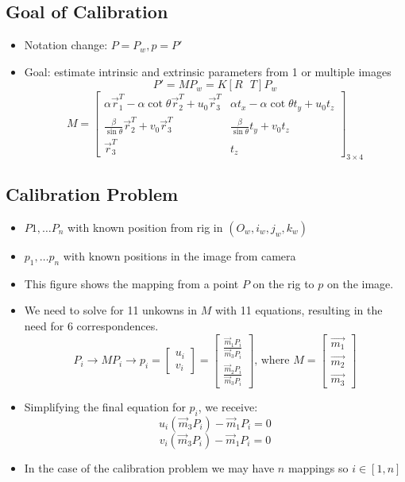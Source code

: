 \subsection{Goal of Calibration}
\begin{itemize}
	\item Notation change: $P=P_w, p=P'$
	\item Goal: estimate intrinsic and extrinsic parameters from 1 or multiple images
	$$P'=MP_w = K[R\text{ }T]P_w$$
	$$M=\begin{bmatrix}
		\alpha\vec{r}_1^T -\alpha\cot\theta\vec{r}_2^T+u_0\vec{r}_3^T &\alpha t_x-\alpha\cot\theta t_y + u_0 t_z \\
		\frac{\beta}{\sin\theta}\vec{r}_2^T+v_0\vec{r}_3^T & \frac{\beta}{\sin\theta}t_y + v_0 t_z \\
		\vec{r}_3^T & t_z
 	\end{bmatrix}_{3\times 4}$$
\end{itemize}

\subsection{Calibration Problem}
\begin{itemize}
	\item $P1,\ldots P_n$ with known position from rig in $(O_w, i_w, j_w, k_w)$
	\item $p_1,\ldots p_n$ with known positions in the image from camera
	\item This figure shows the mapping from a point $P$ on the rig to $p$ on the image.
	\item We need to solve for 11 unkowns in $M$ with 11 equations, resulting in the need for 6 correspondences.
	$$P_i\to MP_i\to p_i=\begin{bmatrix}
		u_i \\ v_i
	\end{bmatrix} = \begin{bmatrix}
		\frac{\vec{m}_1 P_i}{\vec{m}_3 P_i} \\ 
		\frac{\vec{m}_2 P_i}{\vec{m}_3 P_i}
	\end{bmatrix}\text{, where }M=\begin{bmatrix}
		\vec{m_1} \\ \vec{m_2} \\ \vec{m_3}
	\end{bmatrix}$$
	\item Simplifying the final equation for $p_i$, we receive:
	$$u_i (\vec{m}_3 P_i)-\vec{m}_1 P_i = 0$$
	$$v_i (\vec{m}_3 P_i)-\vec{m}_1 P_i = 0$$
	\item In the case of the calibration problem we may have $n$ mappings so $i\in [1, n]$
\end{itemize}


